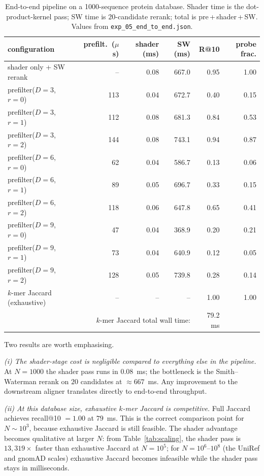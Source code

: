 \documentclass[twocolumn,11pt,a4paper]{article}
\theoremstyle{definition}
\theoremstyle{remark}
\begin{document}
\begin{table}[t]
  \centering\small
  \caption{End-to-end pipeline on a 1000-sequence protein database. Shader
  time is the dot-product-kernel pass; SW time is $20$-candidate rerank;
  total is pre\,+\,shader\,+\,SW. Values from
  \texttt{exp\_05\_end\_to\_end.json}.}
  \label{tab:e2e}
  \begin{tabular}{l | r r r | r r}
    \toprule
    configuration & prefilt.\ ($\mu$s) & shader (ms) & SW (ms) & R@10 & probe frac. \\
    \midrule
    shader only + SW rerank      & --    & 0.08 & 667.0 & 0.95 & 1.00 \\
    prefilter($D{=}3$, $r{=}0$)  & 113 & 0.04 & 672.7 & 0.40 & 0.15 \\
    prefilter($D{=}3$, $r{=}1$)  & 112 & 0.08 & 681.3 & 0.84 & 0.53 \\
    prefilter($D{=}3$, $r{=}2$)  & 144 & 0.08 & 743.1 & 0.94 & 0.87 \\
    prefilter($D{=}6$, $r{=}0$)  &  62 & 0.04 & 586.7 & 0.13 & 0.06 \\
    prefilter($D{=}6$, $r{=}1$)  &  89 & 0.05 & 696.7 & 0.33 & 0.15 \\
    prefilter($D{=}6$, $r{=}2$)  & 118 & 0.06 & 647.8 & 0.65 & 0.41 \\
    prefilter($D{=}9$, $r{=}0$)  &  47 & 0.04 & 368.9 & 0.20 & 0.21 \\
    prefilter($D{=}9$, $r{=}1$)  &  73 & 0.04 & 640.9 & 0.12 & 0.05 \\
    prefilter($D{=}9$, $r{=}2$)  & 128 & 0.05 & 739.8 & 0.28 & 0.14 \\
    $k$-mer Jaccard (exhaustive) & --   & --   & --    & 1.00 & 1.00 \\
    \multicolumn{4}{r|}{$k$-mer Jaccard total wall time:}                 & 79.2 ms & \\
    \bottomrule
  \end{tabular}
\end{table}

Two results are worth emphasising.

\textit{(i) The shader-stage cost is negligible compared to everything
else in the pipeline.} At $N = 1000$ the shader pass runs in $0.08$~ms;
the bottleneck is the Smith--Waterman rerank on $20$ candidates at
$\approx 667$~ms. Any improvement to the downstream aligner translates
directly to end-to-end throughput.

\textit{(ii) At this database size, exhaustive $k$-mer Jaccard is
competitive.} Full Jaccard achieves recall@10 $= 1.00$ at $79$~ms. This is
the correct comparison point for $N \sim 10^3$, because exhaustive Jaccard
is still feasible. The shader advantage becomes qualitative at larger $N$:
from Table~\ref{tab:scaling}, the shader pass is
$13{,}319\times$ faster than exhaustive Jaccard at $N = 10^5$; for
$N = 10^6$--$10^8$ (the UniRef and gnomAD scales) exhaustive Jaccard
becomes infeasible while the shader pass stays in milliseconds.
\end{document}
